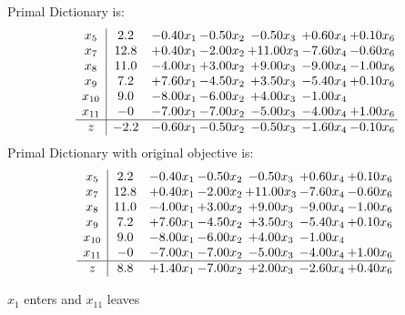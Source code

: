 \documentclass[8pt]{article}
\begin{document}
Primal Dictionary is:
\[\begin{array}{c| c c@{\hskip 2pt} c@{\hskip 2pt} c@{\hskip 2pt} c@{\hskip 2pt} c@{\hskip 2pt} }
 x_{5}   &  2.2 & -0.40 x_{1} & -0.50 x_{2} & -0.50 x_{3} & +  0.60 x_{4} & +  0.10 x_{6}\\
 x_{7}   &  12.8 & +  0.40 x_{1} & -2.00 x_{2} & + 11.00 x_{3} & -7.60 x_{4} & -0.60 x_{6}\\
 x_{8}   &  11.0 & -4.00 x_{1} & +  3.00 x_{2} & +  9.00 x_{3} & -9.00 x_{4} & -1.00 x_{6}\\
 x_{9}   &  7.2 & +  7.60 x_{1} & -4.50 x_{2} & +  3.50 x_{3} & -5.40 x_{4} & +  0.10 x_{6}\\
 x_{10}   &  9.0 & -8.00 x_{1} & -6.00 x_{2} & +  4.00 x_{3} & -1.00 x_{4} &   \\
 x_{11}   &  -0 & -7.00 x_{1} & -7.00 x_{2} & -5.00 x_{3} & -4.00 x_{4} & +  1.00 x_{6}\\
\hline
z    &  -2.2 & -0.60 x_{1} & -0.50 x_{2} & -0.50 x_{3} & -1.60 x_{4} & -0.10 x_{6}\\
\end{array}\]
Primal Dictionary with original objective is:
\[\begin{array}{c| c c@{\hskip 2pt} c@{\hskip 2pt} c@{\hskip 2pt} c@{\hskip 2pt} c@{\hskip 2pt} }
 x_{5}   &  2.2 & -0.40 x_{1} & -0.50 x_{2} & -0.50 x_{3} & +  0.60 x_{4} & +  0.10 x_{6}\\
 x_{7}   &  12.8 & +  0.40 x_{1} & -2.00 x_{2} & + 11.00 x_{3} & -7.60 x_{4} & -0.60 x_{6}\\
 x_{8}   &  11.0 & -4.00 x_{1} & +  3.00 x_{2} & +  9.00 x_{3} & -9.00 x_{4} & -1.00 x_{6}\\
 x_{9}   &  7.2 & +  7.60 x_{1} & -4.50 x_{2} & +  3.50 x_{3} & -5.40 x_{4} & +  0.10 x_{6}\\
 x_{10}   &  9.0 & -8.00 x_{1} & -6.00 x_{2} & +  4.00 x_{3} & -1.00 x_{4} &   \\
 x_{11}   &  -0 & -7.00 x_{1} & -7.00 x_{2} & -5.00 x_{3} & -4.00 x_{4} & +  1.00 x_{6}\\
\hline
z    &  8.8 & +  1.40 x_{1} & -7.00 x_{2} & +  2.00 x_{3} & -2.60 x_{4} & +  0.40 x_{6}\\
\end{array}\]


 $ x_{1} $ enters and $ x_{11} $ leaves 
\end{document}
